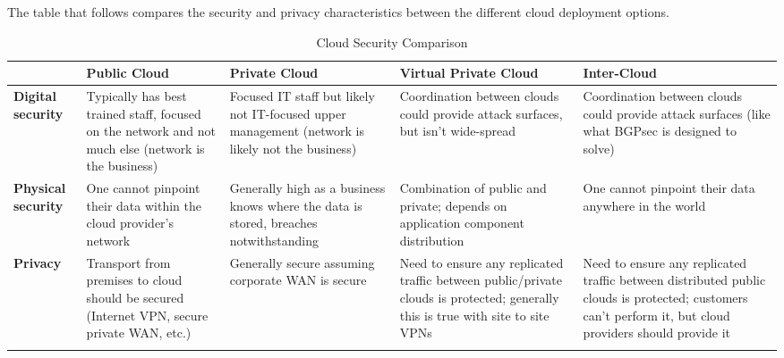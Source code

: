 The table that follows compares the security and privacy characteristics
between the different cloud deployment options.

\begin{longtable}{LLLLL}
  \toprule
  &
  \textbf{Public Cloud}
  &
  \textbf{Private Cloud}
  &
  \textbf{Virtual Private Cloud}
  &
  \textbf{Inter-Cloud}
  \\ \midrule
  \textbf{Digital security}
  &
  Typically has best trained staff, focused on the network and not much else
  (network is the business)
  &
  Focused IT staff but likely not IT-focused upper management (network is
  likely not the business)
  &
  Coordination between clouds could provide attack surfaces, but isn’t
  wide-spread
  &
  Coordination between clouds could provide attack surfaces (like what BGPsec
  is designed to solve)
  \\ \midrule
  \textbf{Physical security}
  &
  One cannot pinpoint their data within the cloud provider’s network
  &
  Generally high as a business knows where the data is stored, breaches
  notwithstanding
  &
  Combination of public and private; depends on application component
  distribution
  &
  One cannot pinpoint their data anywhere in the world
  \\ \midrule
  \textbf{Privacy}
  &
  Transport from premises to cloud should be secured (Internet VPN, secure
  private WAN, etc.)
  &
  Generally secure assuming corporate WAN is secure
  &
  Need to ensure any replicated traffic between public/private clouds is
  protected; generally this is true with site to site VPNs
  &
  Need to ensure any replicated traffic between distributed public clouds is
  protected; customers can't perform it, but cloud providers should provide it
  \\
  \bottomrule
  \caption{Cloud Security Comparison} \\
\end{longtable}
